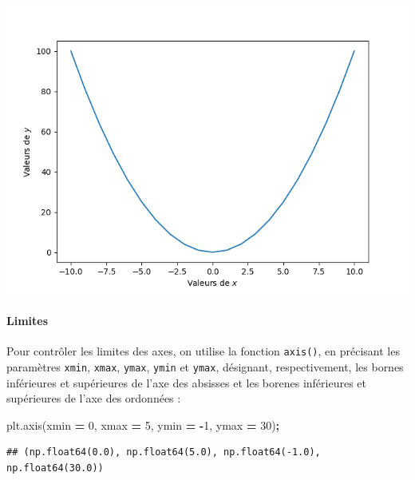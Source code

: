 \documentclass[
  12pt,
]{book}
\newenvironment{Shaded}{\begin{snugshade}}{\end{snugshade}}
\newcommand{\DecValTok}[1]{\textcolor[rgb]{0.00,0.00,0.81}{#1}}
\newcommand{\NormalTok}[1]{#1}
\newcommand{\OperatorTok}[1]{\textcolor[rgb]{0.81,0.36,0.00}{\textbf{#1}}}
\numberwithin{equation}{section}
\numberwithin{countremarque}{section}
\begin{document}
\begin{center}\includegraphics[width=9.03in]{figs/pyplot/plot_axes_label} \end{center}

\paragraph{Limites}\label{limites}

Pour contrôler les limites des axes, on utilise la fonction \texttt{axis()}, en précisant les paramètres \texttt{xmin}, \texttt{xmax}, \texttt{ymax}, \texttt{ymin} et \texttt{ymax}, désignant, respectivement, les bornes inférieures et supérieures de l'axe des absisses et les borenes inférieures et supérieures de l'axe des ordonnées :

\begin{Shaded}
\begin{Highlighting}[]
\NormalTok{plt.axis(xmin }\OperatorTok{=} \DecValTok{0}\NormalTok{, xmax }\OperatorTok{=} \DecValTok{5}\NormalTok{, ymin }\OperatorTok{=} \OperatorTok{{-}}\DecValTok{1}\NormalTok{, ymax }\OperatorTok{=} \DecValTok{30}\NormalTok{)}\OperatorTok{;}
\end{Highlighting}
\end{Shaded}

\begin{lstlisting}
## (np.float64(0.0), np.float64(5.0), np.float64(-1.0), np.float64(30.0))
\end{lstlisting}
\end{document}
